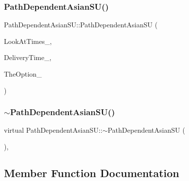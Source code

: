\subsubsection{\texorpdfstring{Path\+Dependent\+Asian\+S\+U()}{PathDependentAsianSU()}}
{\footnotesize\ttfamily Path\+Dependent\+Asian\+S\+U\+::\+Path\+Dependent\+Asian\+SU (\begin{DoxyParamCaption}\item[{const \hyperlink{classMJArray}{M\+J\+Array} \&}]{Look\+At\+Times\+\_\+,  }\item[{double}]{Delivery\+Time\+\_\+,  }\item[{std\+::shared\+\_\+ptr$<$ \hyperlink{classMyOption_1_1Option}{My\+Option\+::\+Option} $>$}]{The\+Option\+\_\+ }\end{DoxyParamCaption})}

\hypertarget{classPathDependentAsianSU_a6405f36696ce70d00e92a9fc4d42b823}{}\label{classPathDependentAsianSU_a6405f36696ce70d00e92a9fc4d42b823} 
\subsubsection{\texorpdfstring{$\sim$\+Path\+Dependent\+Asian\+S\+U()}{~PathDependentAsianSU()}}
{\footnotesize\ttfamily virtual Path\+Dependent\+Asian\+S\+U\+::$\sim$\+Path\+Dependent\+Asian\+SU (\begin{DoxyParamCaption}{ }\end{DoxyParamCaption})\hspace{0.3cm}{\ttfamily [inline]}, {\ttfamily [virtual]}}



\subsection{Member Function Documentation}
\hypertarget{classPathDependentAsianSU_a335120548d42678cef0a43fb955b1636}{}\label{classPathDependentAsianSU_a335120548d42678cef0a43fb955b1636} 
